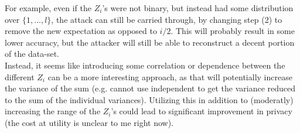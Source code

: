 \noindent For example, even if the $Z_i$'s were not binary, but instead had some distribution over $\{1, ..., l \}$, the attack can still be carried through, by changing step (2) to remove the new expectation as opposed to $i/2$. This will probably result in some lower accuracy, but the attacker will still be able to reconstruct a decent portion of the data-set. \\

\noindent Instead, it seems like introducing some correlation or dependence between the different $Z_i$ can be a more interesting approach, as that will potentially increase the variance of the sum (e.g. cannot use independent to get the variance reduced to the sum of the individual variances). Utilizing this in addition to (moderatly) increasing the range of the $Z_i$'s could lead to significant improvement in privacy (the cost at utility is unclear to me right now).